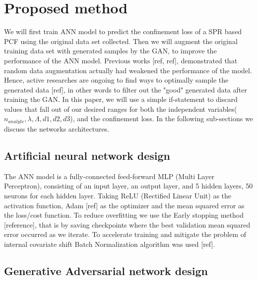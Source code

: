\documentclass[draft, a4, 10pt, onecolumn]{IEEEtran}
\begin{document}
\section{Proposed method}
\label{sec:prop}

We will first train ANN model to predict the confinement loss of a SPR based PCF using the original data set collected. Then we will augment the original training data set with generated samples by the GAN, to improve the performance of the ANN model.
Previous works [ref, ref], demonstrated that random data augmentation actually had weakened the performance of the model. Hence, active researches are ongoing to find ways to optimally sample the generated data [ref], in other words to filter out the "good" generated data after training the GAN. In this paper, we will use a simple if-statement to discard values that fall out of our desired ranges for both the independent variables($n_{analyte}, \lambda, \Lambda, d1, d2, d3$), and the confinement loss. In the following sub-sections we discuss the networks architectures.

\subsection{Artificial neural network design}
\label{ssec:ann}
The ANN model is a fully-connected feed-forward MLP (Multi Layer Perceptron), consisting of an input layer, an output layer, and 5 hidden layers, 50 neurons for each hidden layer. Taking ReLU (Rectified Linear Unit) as the activation function, Adam [ref] as the optimizer and the mean squared error as the loss/cost function. To reduce overfitting we use the Early stopping method [reference], that is by saving checkpoints where the best validation mean squared error occurred as we iterate. To accelerate training and mitigate the problem of internal covariate shift Batch Normalization algorithm was used [ref].

\subsection{Generative Adversarial network design}
\label{ssec:gan}
\end{document}

